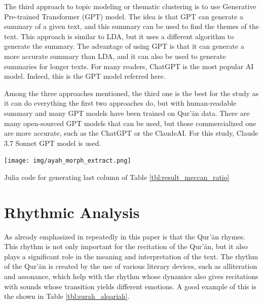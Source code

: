 The third approach to topic modeling or thematic clustering is to use Generative Pre-trained Transformer (GPT) model. The idea is that GPT can generate a summary of a given text, and this summary can be used to find the themes of the text. This approach is similar to LDA, but it uses a different algorithm to generate the summary. The advantage of using GPT is that it can generate a more accurate summary than LDA, and it can also be used to generate summaries for longer texts. For many readers, ChatGPT is the most popular AI model. Indeed, this is the GPT model referred here. 

Among the three approaches mentioned, the third one is the best for the study as it can do everything the first two approaches do, but with human-readable summary and many GPT models have been trained on Qur'\=an data. There are many open-sourced GPT models that can be used, but those commercialized one are more accurate, such as the ChatGPT or the ClaudeAI. For this study, Claude 3.7 Sonnet GPT model is used.

\begin{listing2}[!t]
    \centering
    \texttt{[image: img/ayah\_morph\_extract.png]}
    \caption{Julia code for generating last column of Table \ref{tbl:result_meccan_ratio}}
    \label{fig:result_thematic_analysis}
\end{listing2}

\section{Rhythmic Analysis}\label{sec:result_rhythmic_analysis}
As already emphasized in repeatedly in this paper is that the Qur'\=an rhymes. This rhythm is not only important for the recitation of the Qur'\=an, but it also plays a significant role in the meaning and interpretation of the text. The rhythm of the Qur'\=an is created by the use of various literary devices, such as alliteration and assonance, which help with the rhythm whose dynamics also gives recitations with sounds whose transition yields different emotions. A good example of this is the   shown in Table \ref{tbl:surah_alqariah}.

